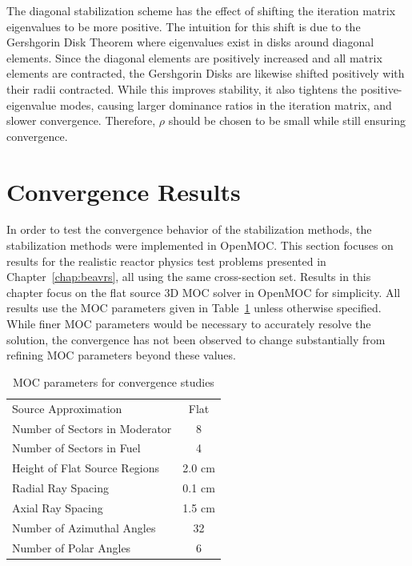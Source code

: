 
The diagonal stabilization scheme has the effect of shifting the iteration matrix eigenvalues to be more positive. The intuition for this shift is due to the Gershgorin Disk Theorem where eigenvalues exist in disks around diagonal elements. Since the diagonal elements are positively increased and all matrix elements are contracted, the Gershgorin Disks are likewise shifted positively with their radii contracted. While this improves stability, it also tightens the positive-eigenvalue modes, causing larger dominance ratios in the iteration matrix, and slower convergence. Therefore, $\rho$ should be chosen to be small while still ensuring convergence. 

\section{Convergence Results}
\label{sec:convergence-results}

In order to test the convergence behavior of the stabilization methods, the stabilization methods were implemented in OpenMOC. This section focuses on results for the realistic reactor physics test problems presented in Chapter~\ref{chap:beavrs}, all using the same cross-section set. Results in this chapter focus on the flat source 3D \ac{MOC} solver in OpenMOC for simplicity. All results use the \ac{MOC} parameters given in Table~\ref{tab:convergence-tests-params} unless otherwise specified. While finer \ac{MOC} parameters would be necessary to accurately resolve the solution, the convergence has not been observed to change substantially from refining \ac{MOC} parameters beyond these values.

\begin{table}[ht]
	\centering
	\caption{MOC parameters for convergence studies}
	\medskip
	\begin{tabular}{lc}
		\hline
		Source Approximation & Flat \\
		Number of Sectors in Moderator & 8 \\
		Number of Sectors in Fuel & 4 \\
		Height of Flat Source Regions & 2.0 cm \\
		Radial Ray Spacing & 0.1 cm \\
		Axial Ray Spacing & 1.5 cm \\
		Number of Azimuthal Angles & 32 \\
		Number of Polar Angles & 6 \\
		\hline
	\end{tabular}
	\label{tab:convergence-tests-params}
\end{table}

